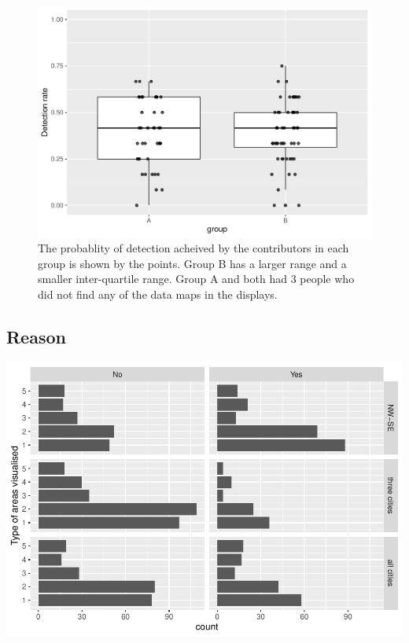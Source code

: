 \documentclass[conference,final,]{IEEEtran}
\makeatletter
\def\maxwidth{\ifdim\Gin@nat@width>\linewidth\linewidth
\else\Gin@nat@width\fi}
\let\Oldincludegraphics\includegraphics
\renewcommand{\includegraphics}[1]{\Oldincludegraphics[width=\maxwidth]{#1}}
\makeatother
\begin{document}
\begin{figure}
\centering
\includegraphics{paper_files/figure-latex/unnamed-chunk-4-1.pdf}
\caption{The probablity of detection acheived by the contributors in
each group is shown by the points. Group B has a larger range and a
smaller inter-quartile range. Group A and both had 3 people who did not
find any of the data maps in the displays.}
\end{figure}

\hypertarget{reason-1}{%
\subsection{Reason}\label{reason-1}}

\includegraphics{paper_files/figure-latex/unnamed-chunk-5-1.pdf}
\end{document}
